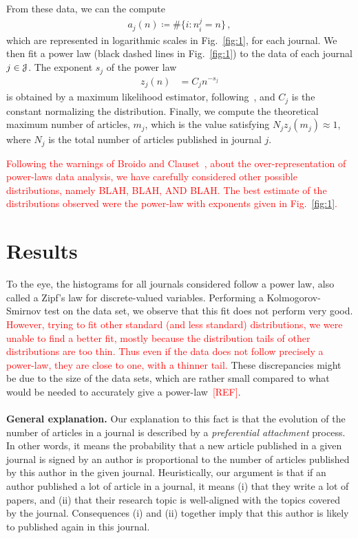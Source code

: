 \documentclass[aps,prl,floatfix,twocolumn]{revtex4-1}
\begin{document}
From these data, we can the compute 
\begin{align}
 a_j(n)\coloneqq\#\{i\colon n^j_i = n\}\, ,
\end{align}
which are represented in logarithmic scales in Fig.~\ref{fig:1}, for each journal. 
We then fit a power law (black dashed lines in Fig.~\ref{fig:1}) to the data of each journal $j\in{\cal J}$. 
The exponent $s_j$ of the power law 
\begin{align}
 z_j(n) &= C_jn^{-s_j}
\end{align}
is obtained by a maximum likelihood estimator, following~\cite{Cla09}, and $C_j$ is the constant normalizing the distribution. 
Finally, we compute the theoretical maximum number of articles, $m_j$, which is the value satisfying $N_jz_j(m_j)\approx1$, where $N_j$ is the total number of articles published in journal $j$. 

\textcolor{red}{
Following the warnings of Broido and Clauset~\cite{Bro18}, about the over-representation of power-laws data analysis, we have carefully considered other possible distributions, namely BLAH, BLAH, AND BLAH. 
The best estimate of the distributions observed were the power-law with exponents given in Fig.~\ref{fig:1}. 
}




\section{Results}
To the eye, the histograms for all journals considered follow a power law, also called a Zipf's law for discrete-valued variables. 
Performing a Kolmogorov-Smirnov test on the data set, we observe that this fit does not perform very good. 
\textcolor{red}{However, trying to fit other standard (and less standard) distributions, we were unable to find a better fit, mostly because the distribution tails of other distributions are too thin. 
Thus even if the data does not follow precisely a power-law, they are close to one, with a thinner tail. 
}
These discrepancies might be due to the size of the data sets, which are rather small compared to what would be needed to accurately give a power-law~\textcolor{red}{[REF]}.

\paragraph{}
{\bf General explanation. }
Our explanation to this fact is that the evolution of the number of articles in a journal is described by a \emph{preferential attachment} process. 
In other words, it means the probability that a new article published in a given journal 
is signed by an author is proportional to the number of articles published by this author in the given journal. 
Heuristically, our argument is that if an author published a lot of article in a journal, it means (i) that they write a lot of papers, 
and (ii) that their research topic is well-aligned with the topics covered by the journal. 
Consequences (i) and (ii) together imply that this author is likely to published again in this journal. 
\end{document}
